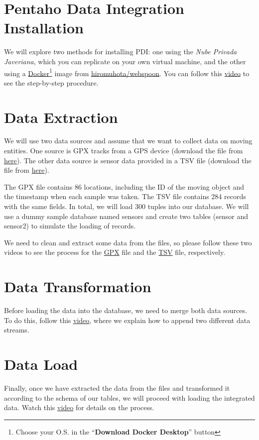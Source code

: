 \documentclass{article}
\begin{document}
\section{Pentaho Data Integration Installation}
We will explore two methods for installing PDI: one using the \textit{Nube Privada Javeriana}, which you can replicate on your own virtual machine, and the other using a \href{https://www.docker.com/products/docker-desktop/}{Docker}\footnote{Choose your O.S. in the ``\textbf{Download Docker Desktop}'' button} image from \href{https://hub.docker.com/r/hiromuhota/webspoon/}{hiromuhota/webspoon}. You can follow this \href{https://youtu.be/MRsLDc4lQvM}{video} to see the step-by-step procedure.

\section{Data Extraction}
We will use two data sources and assume that we want to collect data on moving entities. One source is GPX tracks from a GPS device (download the file from \href{https://drive.google.com/file/d/1eyb5l5RjimtkEdgKsqet2AVUfHqBydWK/view?usp=drive_link}{here}). The other data source is sensor data provided in a TSV file (download the file from \href{https://drive.google.com/file/d/13r72OnZu4TZc1HqLNFjZMOkkXk5kWRDt/view?usp=drive_link}{here}).

The GPX file contains 86 locations, including the ID of the moving object and the timestamp when each sample was taken. The TSV file contains 284 records with the same fields. In total, we will load 300 tuples into our database. We will use a dummy sample database named sensors and create two tables (sensor and sensor2) to simulate the loading of records.

We need to clean and extract some data from the files, so please follow these two videos to see the process for the \href{https://youtu.be/sF_9FHAxnPw}{GPX} file and the \href{https://youtu.be/vFGsc9EbUFQ}{TSV} file, respectively.

\section{Data Transformation}
Before loading the data into the database, we need to merge both data sources. To do this, follow this \href{https://youtu.be/sw12QycWSg4}{video}, where we explain how to append two different data streams.

\section{Data Load}
Finally, once we have extracted the data from the files and transformed it according to the schema of our tables, we will proceed with loading the integrated data. Watch this \href{https://youtu.be/8BMu1G0O2EE}{video} for details on the process.
\end{document}
